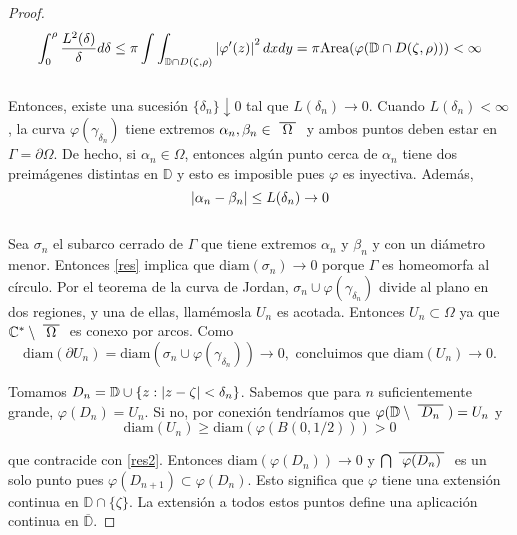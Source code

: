 \begin{proof}
    \begin{equation*}
        \int_{0}^{\rho} \frac{L^2(\delta)}{\delta} d\delta \leq \pi \int \int_{\mathbb{D} \cap D(\zeta, \rho)} \left\lvert\varphi ' (z)\right\rvert^2 dxdy = \pi \text{Area}(\varphi(\mathbb{D} \cap D(\zeta, \rho))) < \infty
    \end{equation*}
    \\
    Entonces, existe una sucesión $\{ \delta_n\} \downarrow 0$ tal que $L(\delta_n) \rightarrow 0$. Cuando $L(\delta_n) < \infty$, la curva $\varphi(\gamma_{\delta_n})$ tiene extremos $\alpha_n, \beta_n \in \xbar{\Omega}$ y ambos puntos deben estar en $\Gamma = \partial \Omega$. De hecho, si $\alpha_n \in \Omega$, entonces algún punto cerca de $\alpha_n$ tiene dos preimágenes distintas en $\mathbb{D}$ y esto es imposible pues $\varphi$ es inyectiva. Además,
    \begin{equation}\label{res}
        \left\lvert\alpha_n - \beta_n\right\rvert \leq L(\delta_n) \rightarrow 0
    \end{equation}
    \\
    Sea $\sigma_n$ el subarco cerrado de $\Gamma$ que tiene extremos $\alpha_n$ y $\beta_n$ y con un diámetro menor. Entonces \ref{res} implica que $\text{diam}(\sigma_n) \rightarrow 0$ porque $\Gamma$ es homeomorfa al círculo. Por el teorema de la curva de Jordan, $\sigma_n \cup \varphi(\gamma_{\delta_n})$ divide al plano en dos regiones, y una de ellas, llamémosla $U_n$ es acotada. Entonces $U_n \subset \Omega$ ya que $\mathbb{C}^* \setminus \xbar{\Omega}$ es conexo por arcos. Como
    \begin{equation}
        \label{res2}
        \text{diam}(\partial U_n) = \text{diam}(\sigma_n \cup \varphi(\gamma_{\delta_n})) \rightarrow 0,
        \text{ concluimos que }
        \text{diam}(U_n) \rightarrow 0.
    \end{equation}

    Tomamos $D_n = \mathbb{D} \cup \{ z: \left\lvert z - \zeta\right\rvert < \delta_n \}$. Sabemos que para $n$ suficientemente grande, $\varphi(D_n) = U_n$. Si no, por conexión tendríamos que $\varphi(\mathbb{D} \setminus \xbar{D_n}) = U_n$ y
    \begin{equation*}
        \text{diam} (U_n) \geq \text{diam} (\varphi(B(0, 1/2))) > 0
    \end{equation*}

    que contracide con \ref{res2}. Entonces $\text{diam}(\varphi(D_n)) \rightarrow 0$ y $\bigcap \xbar{\varphi(D_n)}$ es un solo punto pues $\varphi(D_{n+1}) \subset \varphi(D_n)$. Esto significa que $\varphi$ tiene una extensión continua en $\mathbb{D} \cap \{ \zeta \}$. La extensión a todos estos puntos define una aplicación continua en $\overline{\mathbb{D}}$.


\end{proof}
